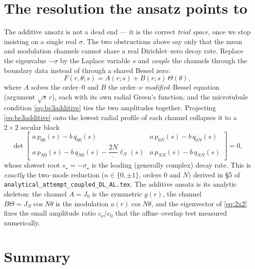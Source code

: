 \documentclass{article}
\begin{document}
\section{The resolution the ansatz points to}

The additive ansatz is not a dead end --- it is the correct \emph{trial space},
once we stop insisting on a single real $\sigma$. The two obstructions above say
only that the mean and modulation channels cannot share a real Dirichlet--zero
decay rate. Replace the eigenvalue $-\sigma$ by the Laplace variable $s$ and
\emph{couple} the channels through the boundary data instead of through a shared
Bessel zero:
\begin{equation}
F(r,\theta;s)=A(r;s)+B(r;s)\,\Theta(\theta),
\end{equation}
where $A$ solves the order--$0$ and $B$ the order--$\nu$ \emph{modified}--Bessel
equation (argument $\sqrt s\,r$), each with its own radial Green's function, and
the microtubule condition \eqref{eq:bc3additive} ties the two amplitudes
together. Projecting \eqref{eq:bc3additive} onto the lowest radial profile of
each channel collapses it to a $2\times2$ secular block
\begin{equation}
\det
\begin{bmatrix}
a\,p_{00}(s)-b\,q_{00}(s) & a\,p_{0N}(s)-b\,q_{0N}(s)\\[4pt]
a\,p_{N0}(s)-b\,q_{N0}(s)-\dfrac{2N}{\,\cdot\,}\ell_N(s)
& a\,p_{NN}(s)-b\,q_{NN}(s)
\end{bmatrix}=0,
\label{eq:2x2}
\end{equation}
whose slowest root $s_\star=-\sigma_\star$ is the leading (generally complex)
decay rate. This is \emph{exactly} the two--mode reduction
($n\in\{0,\pm1\}$, orders $0$ and $N$) derived in \S5 of
\texttt{analytical\_attempt\_coupled\_DL\_AL.tex}. The additive ansatz is its
analytic skeleton: the channel $A=J_0$ is the symmetric $g(r)$, the channel
$B\Theta=J_N\cos N\theta$ is the modulation $a(r)\cos N\theta$, and the
eigenvector of \eqref{eq:2x2} fixes the small amplitude ratio $c_\nu/c_0$ that
the affine--overlap test measured numerically.

\section{Summary}
\end{document}
